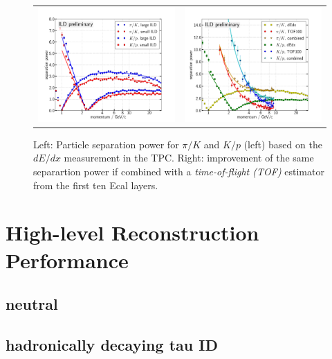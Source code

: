 %
% 
\begin{figure}[b!]
\begin{tabular}{cc}
\includegraphics[width=0.5\hsize]{Performance/fig/dEdx_ILDls_separation_power.pdf} &
\includegraphics[width=0.5\hsize]{Performance/fig/Combined_dEdx_TOF100.pdf}
\end{tabular}
\caption{\label{fig:perf:trkeff_jer_dedx} Left: Particle separation power for $\pi/K$ and $K/p$ (left) based on the $dE/dx$ measurement in the TPC.
Right: improvement of the same separartion power if combined with a {\em time-of-flight (TOF)} estimator from the first ten Ecal layers.}
 \end{figure}



\section{High-level Reconstruction Performance}

\subsection{neutral}
\subsection{hadronically decaying tau ID}

